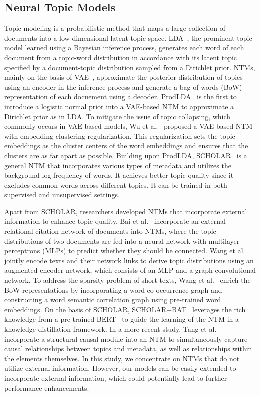 \documentclass{article}
\begin{document}
\subsection{Neural Topic Models}
Topic modeling is a probabilistic method that maps a large collection of documents into a low-dimensional latent topic space.
LDA~\cite{blei2003latent}, the prominent topic model learned using a Bayesian inference process, generates each word of each document from a topic-word distribution in accordance with its latent topic specified by a document-topic distribution sampled from a Dirichlet prior. 
NTMs, mainly on the basis of VAE~\cite{welling2014auto}, approximate the posterior distribution of topics using an encoder in the inference process and generate a bag-of-words (BoW) representation of each docuement using a decoder. 
ProdLDA~\cite{srivastava2017autoencoding} is the first to introduce a logistic normal prior into a VAE-based NTM to approximate a Dirichlet prior as in LDA. 
To mitigate the issue of topic collapsing, which commonly occurs in VAE-based models, Wu et al.~\cite{wu2023effective} proposed a VAE-based NTM with embedding clustering regularization. This regularization sets the topic embeddings as the cluster centers of the word embeddings and ensures that the clusters are as far apart as possible.
Building upon ProdLDA, SCHOLAR~\cite{card2018neural} is a general NTM that incorporates various types of metadata and utilizes the background log-frequency of words. It achieves better topic quality since it excludes common words across different topics. It can be trained in both supervised and unsupervised settings.

Apart from SCHOLAR, researchers developed NTMs that incorporate external information to enhance topic quality.
Bai et al.~\cite{bai2018neural} incorporate an external relational citation network of documents into NTMs, where the topic distributions of two documents are fed into a neural network with multilayer perceptrons (MLPs) to predict whether they should be connected.
Wang et al.~\cite{wang2021layer} jointly encode texts and their network links to derive topic distributions using an augmented encoder network, which consists of an MLP and a graph convolutional network.
To address the sparsity problem of short texts, Wang et al.~\cite{wang2021extracting} enrich the BoW representations by incorporating a word co-occurrence graph and constructing a word semantic correlation graph using pre-trained word embeddings.
On the basis of SCHOLAR, SCHOLAR+BAT~\cite{hoyle2020improving} leverages the rich knowledge from a pre-trained BERT~\cite{devlin2019bert} to guide the learning of the NTM in a knowledge distillation framework.
In a more recent study, Tang et al.~\cite{tang2024beyond} incorporate a structural causal module into an NTM to simultaneously capture causal relationships between topics and metadata, as well as relationships within the elements themselves.
In this study, we concentrate on NTMs that do not utilize external information. 
However, our models can be easily extended to incorporate external information, which could potentially lead to further performance enhancements.
\end{document}
